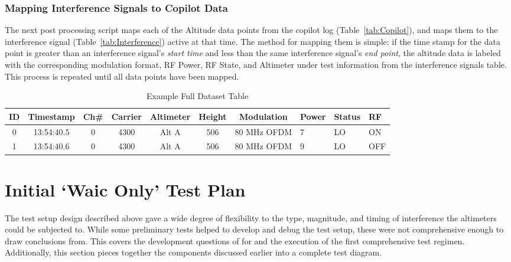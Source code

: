 \subsubsection{Mapping Interference Signals to Copilot Data}
The next post processing script maps each of the Altitude data points from the copilot log (Table~\ref{tab:Copilot}), and maps them to the interference signal (Table~\ref{tab:Interference}) active at that time. The method for mapping them is simple: if the time stamp for the data point is greater than an interference signal's \textit{start time} and less than the same interference signal's \textit{end point}, the altitude data is labeled with the corresponding modulation format, RF Power, RF State, and Altimeter under test information from the interference signals table. This process is repeated until all data points have been mapped. 

\begin{table}[]
\centering
\begin{tabular}{@{}ccccccclll@{}}

\toprule
ID & Timestamp  & Ch\# & Carrier& Altimeter & Height & Modulation  & Power& Status & RF \\ \midrule
0  & 13:54:40.5 & 0    & 4300              & Alt A     & 506             & 80 MHz OFDM & 7               & LO     & ON       \\
1  & 13:54:40.6 & 0    & 4300              & Alt A     & 506             & 80 MHz OFDM & 9               & LO     & OFF      \\ \bottomrule
\end{tabular}
\caption{Example Full Dataset Table}
\label{tab:Full}
\end{table}

\section{Initial `Waic Only' Test Plan}\label{sec:initial}
The test setup design described above gave a wide degree of flexibility to the type, magnitude, and timing of interference the altimeters could be subjected to. While some preliminary tests helped to develop and debug the test setup, these were not comprehensive enough to draw conclusions from. This covers the development questions of for and the execution of the first  comprehensive test regimen. Additionally, this section pieces together the components discussed earlier into a complete test diagram. 

